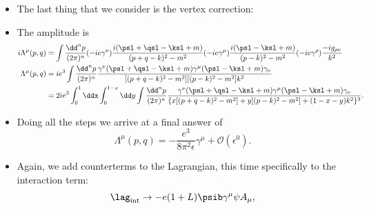 \begin{itemize}
    \item The last thing that we consider is the vertex correction:
        \begin{center}
        \end{center}
    \item The amplitude is
        \begin{align}
            i\Lambda^{\mu}(p,q) &= \int \frac{\dd^n p}{(2\pi)^n} (-ie\gamma^{\nu}) \frac{i(\psl + \qsl - \ksl + m)}{(p+q-k)^2 - m^2}(-ie\gamma^{\mu}) \frac{i(\psl - \ksl + m)}{(p-k)^2 - m^2} (-ie\gamma^{\rho}) \frac{-ig_{\rho\nu}}{k^2} \\
            \Lambda^{\mu}(p,q) &= ie^3 \int \frac{\dd^n p}{(2\pi)^n} \frac{\gamma^{\nu}(\psl + \qsl - \ksl + m)\gamma^{\mu}(\psl - \ksl + m)\gamma_{\nu}}{[(p+q-k)^2 - m^2][(p-k)^2 - m^2]k^2} \\
            &= 2ie^3 \int_0^1 \ddx \int_0^{1-x}\dd y \int \frac{\dd^n p}{(2\pi)^n} \frac{\gamma^{\nu}(\psl + \qsl - \ksl + m)\gamma^{\mu}(\psl - \ksl + m)\gamma_{\nu}}{\{x[(p+q-k)^2 - m^2] + y[(p-k)^2 - m^2] + (1-x-y)k^2\}^3}.
        \end{align}
    \item Doing all the steps we arrive at a final answer of
        \begin{equation}
            \Lambda^{\mu}(p,q) = -\frac{e^3}{8\pi^2\epsilon}\gamma^{\mu} + \mathcal{O}(\epsilon^0).
        \end{equation}
    \item Again, we add counterterms to the Lagrangian, this time specifically to the interaction term:
        \begin{equation}
            \lag_{\mathrm{int}} \rightarrow -e(1+L)\psib \gamma^{\mu} \psi A_{\mu},

\end{equation}
\end{itemize}
